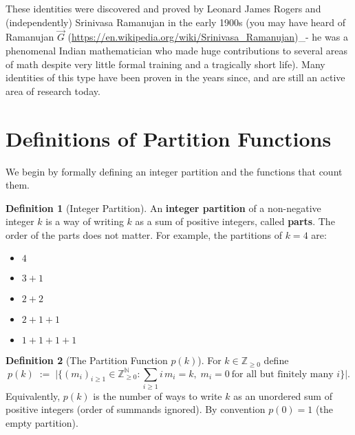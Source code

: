 \documentclass{article}
\theoremstyle{definition}
\newtheorem{definition}{Definition}
\begin{document}
These identities were discovered and proved by Leonard James Rogers and (independently) Srinivasa Ramanujan in the early 1900s (you may have heard of Ramanujan $\vec{G}$ (\href{https://en.wikipedia.org/wiki/Srinivasa_Ramanujan}{https://en.wikipedia.org/wiki/Srinivasa\_Ramanujan})\_- he was a phenomenal Indian mathematician who made huge contributions to several areas of math despite very little formal training and a tragically short life). Many identities of this type have been proven in the years since, and are still an active area of research today.









\newpage



\begin{abstract}
  This document provides formal definitions for several integer partition functions, introduces their associated ordinary generating functions, and presents a proof for a fundamental duality theorem that connects two distinct types of restricted partitions.
\end{abstract}

\section{Definitions of Partition Functions}

We begin by formally defining an integer partition and the functions that count them.

\begin{definition}[Integer Partition]
  An \textbf{integer partition} of a non-negative integer $k$ is a way of writing $k$ as a sum of positive integers, called \textbf{parts}. The order of the parts does not matter. For example, the partitions of $k=4$ are:
  \begin{itemize}
    \item $4$
    \item $3+1$
    \item $2+2$
    \item $2+1+1$
    \item $1+1+1+1$
  \end{itemize}
\end{definition}

\begin{definition}[The Partition Function $p(k)$]
  For $k\in\mathbb{Z}_{\ge0}$ define
  \[
    p(k)\;:=\;\Bigg|\Big\{(m_i)_{i\ge1}\in\mathbb{Z}_{\ge0}^{\mathbb{N}} :
    \sum_{i\ge1} i\,m_i = k,\; m_i=0\ \text{for all but finitely many }i\Big\}\Bigg|.
  \]
  Equivalently, $p(k)$ is the number of ways to write $k$ as an unordered sum of positive integers (order of summands ignored). By convention $p(0)=1$ (the empty partition).
\end{definition}
\end{document}
